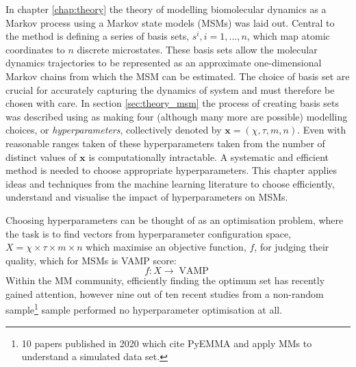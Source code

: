 In chapter \ref{chap:theory} the theory of modelling biomolecular dynamics as a Markov process using a Markov state models (MSMs) was laid out. Central to the method is defining  a series of basis sets, $s^i, i=1, ..., n$, which  map atomic coordinates to $n$ discrete microstates. These basis sets allow the molecular dynamics trajectories to be represented as an approximate one-dimensional Markov chains from which the MSM can be estimated. The choice of basis set are crucial for accurately capturing the dynamics of system\cite{husicOptimizedParameterSelection2016} and must therefore be chosen with care. In section \ref{sec:theory_msm} the process of creating basis sets was described using as making four (although many more are possible) modelling choices, or  \emph{hyperparameters}, collectively denoted by $\mathbf{x} = (\chi, \tau, m, n)$. Even with reasonable ranges taken of these hyperparameters taken from\cite{husicOptimizedParameterSelection2016} the number of distinct values of $\mathbf{x}$ is computationally intractable. A systematic and efficient method is needed to choose appropriate hyperparameters. This chapter applies ideas and techniques from the machine learning literature to choose efficiently, understand and visualise the impact of hyperparameters on MSMs. 

Choosing hyperparameters can be thought of as an optimisation problem\cite{feurer2019hyperparameter,jonesEfficientGlobalOptimization1998}, where the task is to find  vectors from hyperparameter configuration space, $X=\chi \times \tau \times m \times n$  which maximise an objective function, $f$, for judging their quality, which for MSMs is VAMP score:  
\begin{equation}
    f: X \rightarrow \operatorname{VAMP}
\end{equation}
Within the MM community, efficiently finding the optimum set has recently gained attention\cite{schererVariationalSelectionFeatures2019}, however nine out of ten recent studies from a non-random sample\footnote{10 papers published in 2020 which cite PyEMMA\cite{schererPyEMMASoftwarePackage2015a} and apply MMs to understand a simulated data set.} sample performed no hyperparameter optimisation at all.  

